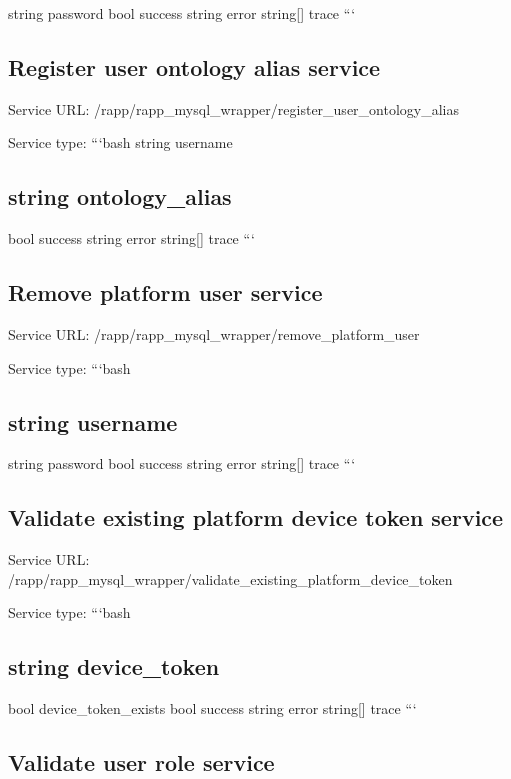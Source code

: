 string password bool success string error string\mbox{[}\mbox{]} trace ```

\subsection*{Register user ontology alias service}

Service U\-R\-L\-: {\ttfamily /rapp/rapp\-\_\-mysql\-\_\-wrapper/register\-\_\-user\-\_\-ontology\-\_\-alias}

Service type\-: ```bash string username \subsection*{string ontology\-\_\-alias }

bool success string error string\mbox{[}\mbox{]} trace ```

\subsection*{Remove platform user service}

Service U\-R\-L\-: {\ttfamily /rapp/rapp\-\_\-mysql\-\_\-wrapper/remove\-\_\-platform\-\_\-user}

Service type\-: ```bash \subsection*{string username }

string password bool success string error string\mbox{[}\mbox{]} trace ```

\subsection*{Validate existing platform device token service}

Service U\-R\-L\-: {\ttfamily /rapp/rapp\-\_\-mysql\-\_\-wrapper/validate\-\_\-existing\-\_\-platform\-\_\-device\-\_\-token}

Service type\-: ```bash \subsection*{string device\-\_\-token }

bool device\-\_\-token\-\_\-exists bool success string error string\mbox{[}\mbox{]} trace ```

\subsection*{Validate user role service}


